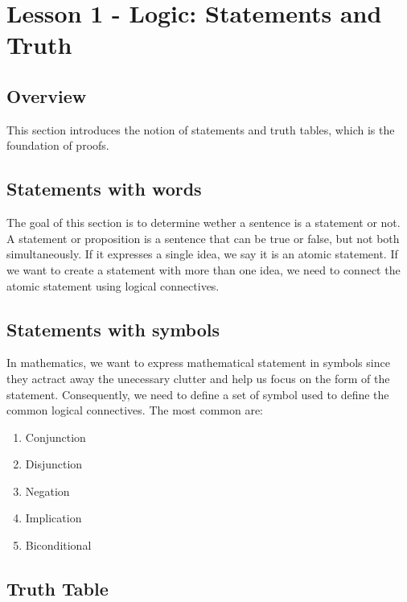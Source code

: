 \documentclass{article}
\begin{document}
\section{Lesson 1 - Logic: Statements and Truth}

\subsection{Overview}

This section introduces the notion of statements and truth tables, which is the
foundation of proofs.

\subsection{Statements with words}

\par
The goal of this section is to determine wether a sentence is a statement or not.\\

A statement or proposition is a sentence that can be true or false, but not both
simultaneously. If it expresses a single idea, we say it is an atomic statement.
If we want to create a statement with more than one idea, we need to connect the
atomic statement using logical connectives.

\subsection{Statements with symbols}

In mathematics, we want to express mathematical statement in symbols since they
actract away the unecessary clutter and help us focus on the form of the statement.
Consequently, we need to define a set of symbol used to define the common logical
connectives. The most common are:

\begin{enumerate}
    \item Conjunction
    \item Disjunction
    \item Negation
    \item Implication
    \item Biconditional
\end{enumerate}

\subsection{Truth Table}
\end{document}
